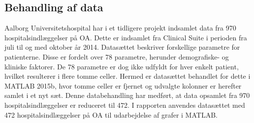 \subsection{Behandling af data}
Aalborg Universitetshospital har i et tidligere projekt indsamlet data fra 970 hospitalsindlæggelser på OA. Dette er indsamlet fra Clinical Suite i perioden fra juli til og med oktober år 2014. Datasættet beskriver forskellige parametre for patienterne. Disse er fordelt over 78 parametre, herunder demografiske- og kliniske faktorer. De 78 parametre er dog ikke udfyldt for hver enkelt patient, hvilket resulterer i flere tomme celler. Hermed er datasættet behandlet for dette i MATLAB 2015b, hvor tomme celler er fjernet og udvalgte kolonner er herefter samlet i et nyt sæt. Denne databehandling har medført, at data opsamlet fra 970 hospitalsindlæggelser er reduceret til 472. I rapporten anvendes datasættet med 472 hospitalsindlæggelser på OA til udarbejdelse af grafer i MATLAB. 
